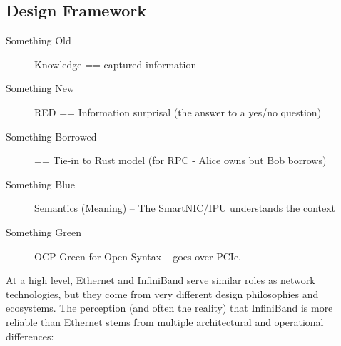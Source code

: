 \subsection{Design Framework}


\begin{description}
	\item [Something Old] Knowledge == captured information
	\item [Something New] RED == Information surprisal (the answer to a yes/no question)
	\item [Something Borrowed] == Tie-in to Rust model (for RPC - Alice owns but Bob borrows)
	\item [Something Blue] Semantics (Meaning) -- The SmartNIC/IPU understands the context
	\item [Something Green]  OCP Green for Open Syntax -- goes over PCIe. 
\end{description}









\clearpage
 
 
At a high level, Ethernet and InfiniBand serve similar roles as network technologies, but they come from very different design philosophies and ecosystems. The perception (and often the reality) that InfiniBand is more reliable than Ethernet stems from multiple architectural and operational differences:

